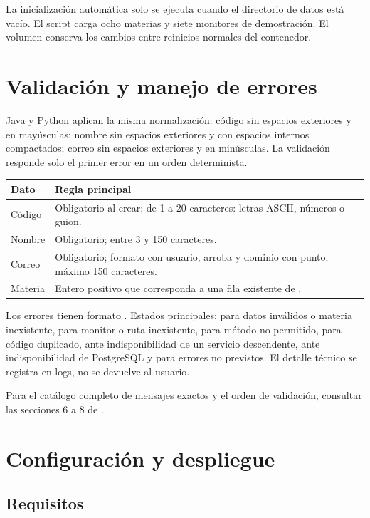 La inicialización automática solo se ejecuta cuando el directorio de datos está vacío. El script carga ocho materias y siete monitores de demostración. El volumen  conserva los cambios entre reinicios normales del contenedor.

\section{Validación y manejo de errores}

Java y Python aplican la misma normalización: código sin espacios exteriores y en mayúsculas; nombre sin espacios exteriores y con espacios internos compactados; correo sin espacios exteriores y en minúsculas. La validación responde solo el primer error en un orden determinista.

\begin{tabularx}{\textwidth}{p{}Y}
\toprule
\textbf{Dato} & \textbf{Regla principal} \\
\midrule
Código & Obligatorio al crear; de 1 a 20 caracteres: letras ASCII, números o guion. \\
Nombre & Obligatorio; entre 3 y 150 caracteres. \\
Correo & Obligatorio; formato con usuario, arroba y dominio con punto; máximo 150 caracteres. \\
Materia & Entero positivo que corresponda a una fila existente de . \\
\bottomrule
\end{tabularx}

Los errores tienen formato . Estados principales:  para datos inválidos o materia inexistente,  para monitor o ruta inexistente,  para método no permitido,  para código duplicado,  ante indisponibilidad de un servicio descendente,  ante indisponibilidad de PostgreSQL y  para errores no previstos. El detalle técnico se registra en logs, no se devuelve al usuario.

Para el catálogo completo de mensajes exactos y el orden de validación, consultar las secciones 6 a 8 de .

\section{Configuración y despliegue}

\subsection{Requisitos}

